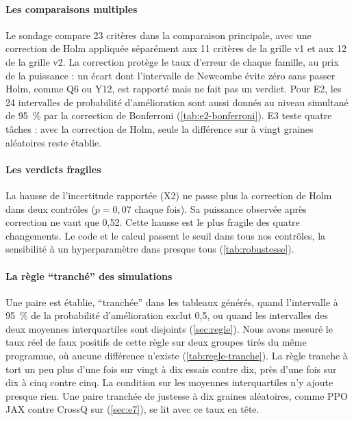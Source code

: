\paragraph{Les comparaisons multiples} Le sondage compare 23 critères dans la comparaison
principale, avec une correction de Holm appliquée séparément aux 11 critères de la grille v1 et aux
12 de la grille v2. La correction protège le taux d'erreur de chaque famille, au prix de la
puissance : un écart dont l'intervalle de Newcombe évite zéro sans passer Holm, comme Q6 ou Y12, est
rapporté mais ne fait pas un verdict. Pour E2, les 24 intervalles de probabilité d'amélioration sont
aussi donnés au niveau simultané de 95~\% par la correction de Bonferroni
(\cref{tab:e2-bonferroni}). E3 teste quatre tâches : avec la correction de Holm, seule la
différence sur  à vingt graines aléatoires reste établie.

\paragraph{Les verdicts fragiles} La hausse de l'incertitude rapportée (X2) ne passe plus la
correction de Holm dans deux contrôles ($p = 0{,}07$ chaque fois). Sa puissance observée après
correction ne vaut que 0,52. Cette hausse est le plus fragile des quatre changements. Le
code et le calcul passent le seuil dans tous nos contrôles, la sensibilité à un hyperparamètre dans
presque tous (\cref{tab:robustesse}).

\paragraph{La règle \enquote{tranché} des simulations} Une paire est établie, \enquote{tranchée}
dans les tableaux générés, quand l'intervalle à 95~\% de la probabilité d'amélioration exclut 0,5, ou quand les intervalles des deux
moyennes interquartiles sont disjoints (\cref{sec:regle}). Nous avons mesuré le taux réel de faux
positifs de cette règle sur deux groupes tirés du même programme, où aucune différence n'existe
(\cref{tab:regle-tranche}). La règle tranche à tort un peu plus d'une fois sur vingt à
dix essais contre dix, près d'une fois sur dix à cinq contre cinq. La condition sur les moyennes
interquartiles n'y ajoute presque rien. Une paire tranchée de justesse à dix graines
aléatoires, comme PPO JAX contre CrossQ sur  (\cref{sec:e7}), se lit avec ce taux en
tête.

